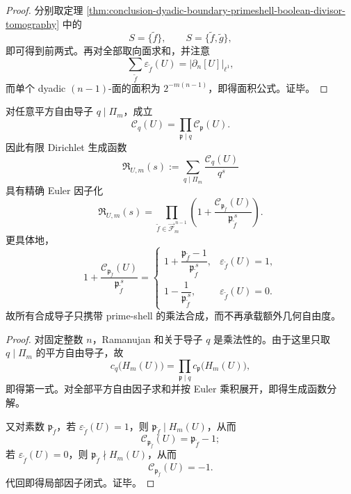 \begin{proof}
分别取定理 \ref{thm:conclusion-dyadic-boundary-primeshell-boolean-divisor-tomography} 中的
\[
S=\{\widetilde f\},
\qquad
S=\{\widetilde f,\widetilde g\},
\]
即可得到前两式。再对全部取向面求和，并注意
\[
\sum_{\widetilde f}\varepsilon_{\widetilde f}(U)=|\partial_n[U]|_{\ell^1},
\]
而单个 dyadic \((n-1)\)-面的面积为 \(2^{-m(n-1)}\)，即得面积公式。证毕。
\end{proof}

\begin{theorem}\label{thm:conclusion-dyadic-boundary-primeshell-composite-conductors-redundant}
对任意平方自由导子 \(q\mid \Pi_m\)，成立
\[
\mathcal C_q(U)=\prod_{\mathfrak p\mid q}\mathcal C_{\mathfrak p}(U).
\]
因此有限 Dirichlet 生成函数
\[
\mathfrak R_{U,m}(s):=\sum_{q\mid \Pi_m}\frac{\mathcal C_q(U)}{q^s}
\]
具有精确 Euler 因子化
\[
\mathfrak R_{U,m}(s)
=
\prod_{\widetilde f\in \overrightarrow{\mathcal F}^{\,n-1}_m}
\left(
1+\frac{\mathcal C_{\mathfrak p_{\widetilde f}}(U)}{\mathfrak p_{\widetilde f}^{\,s}}
\right).
\]
更具体地，
\[
1+\frac{\mathcal C_{\mathfrak p_{\widetilde f}}(U)}{\mathfrak p_{\widetilde f}^{\,s}}
=
\begin{cases}
1+\dfrac{\mathfrak p_{\widetilde f}-1}{\mathfrak p_{\widetilde f}^{\,s}},
& \varepsilon_{\widetilde f}(U)=1,
\\[8pt]
1-\dfrac{1}{\mathfrak p_{\widetilde f}^{\,s}},
& \varepsilon_{\widetilde f}(U)=0.
\end{cases}
\]
故所有合成导子只携带 prime-shell 的乘法合成，而不再承载额外几何自由度。
\end{theorem}

\begin{proof}
对固定整数 \(n\)，Ramanujan 和关于导子 \(q\) 是乘法性的。由于这里只取 \(q\mid \Pi_m\) 的平方自由导子，故
\[
c_q\!\bigl(H_m(U)\bigr)
=
\prod_{\mathfrak p\mid q}c_{\mathfrak p}\!\bigl(H_m(U)\bigr),
\]
即得第一式。对全部平方自由因子求和并按 Euler 乘积展开，即得生成函数分解。

又对素数 \(\mathfrak p_{\widetilde f}\)，若 \(\varepsilon_{\widetilde f}(U)=1\)，则 \(\mathfrak p_{\widetilde f}\mid H_m(U)\)，从而
\[
\mathcal C_{\mathfrak p_{\widetilde f}}(U)=\mathfrak p_{\widetilde f}-1;
\]
若 \(\varepsilon_{\widetilde f}(U)=0\)，则 \(\mathfrak p_{\widetilde f}\nmid H_m(U)\)，从而
\[
\mathcal C_{\mathfrak p_{\widetilde f}}(U)=-1.
\]
代回即得局部因子闭式。证毕。
\end{proof}

